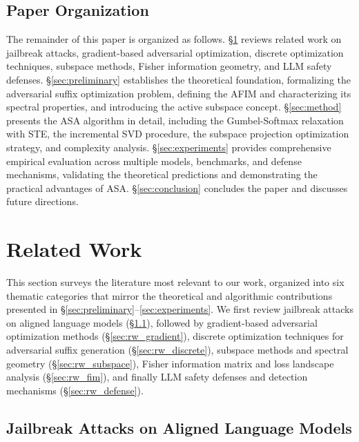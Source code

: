 \documentclass[preprint,12pt]{elsarticle}
\begin{document}
\subsection{Paper Organization}
\label{sec:organization}

The remainder of this paper is organized as follows. \S\ref{sec:related_work} reviews related work on jailbreak attacks, gradient-based adversarial optimization, discrete optimization techniques, subspace methods, Fisher information geometry, and LLM safety defenses. \S\ref{sec:preliminary} establishes the theoretical foundation, formalizing the adversarial suffix optimization problem, defining the AFIM and characterizing its spectral properties, and introducing the active subspace concept. \S\ref{sec:method} presents the ASA algorithm in detail, including the Gumbel-Softmax relaxation with STE, the incremental SVD procedure, the subspace projection optimization strategy, and complexity analysis. \S\ref{sec:experiments} provides comprehensive empirical evaluation across multiple models, benchmarks, and defense mechanisms, validating the theoretical predictions and demonstrating the practical advantages of ASA. \S\ref{sec:conclusion} concludes the paper and discusses future directions.





\section{Related Work}
\label{sec:related_work}

This section surveys the literature most relevant to our work, organized into six thematic categories that mirror the theoretical and algorithmic contributions presented in \S\ref{sec:preliminary}--\ref{sec:experiments}. We first review jailbreak attacks on aligned language models (\S\ref{sec:rw_jailbreak}), followed by gradient-based adversarial optimization methods (\S\ref{sec:rw_gradient}), discrete optimization techniques for adversarial suffix generation (\S\ref{sec:rw_discrete}), subspace methods and spectral geometry (\S\ref{sec:rw_subspace}), Fisher information matrix and loss landscape analysis (\S\ref{sec:rw_fim}), and finally LLM safety defenses and detection mechanisms (\S\ref{sec:rw_defense}).

\subsection{Jailbreak Attacks on Aligned Language Models}
\label{sec:rw_jailbreak}
\end{document}
